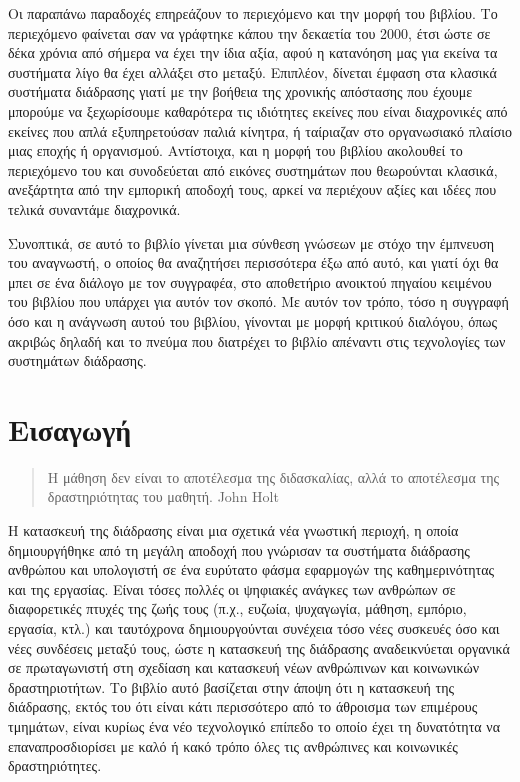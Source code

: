 \documentclass[
]{article}
\begin{document}
Οι παραπάνω παραδοχές επηρεάζουν το περιεχόμενο και την μορφή του
βιβλίου. Το περιεχόμενο φαίνεται σαν να γράφτηκε κάπου την δεκαετία του
2000, έτσι ώστε σε δέκα χρόνια από σήμερα να έχει την ίδια αξία, αφού η
κατανόηση μας για εκείνα τα συστήματα λίγο θα έχει αλλάξει στο μεταξύ.
Επιπλέον, δίνεται έμφαση στα κλασικά συστήματα διάδρασης γιατί με την
βοήθεια της χρονικής απόστασης που έχουμε μπορούμε να ξεχωρίσουμε
καθαρότερα τις ιδιότητες εκείνες που είναι διαχρονικές από εκείνες που
απλά εξυπηρετούσαν παλιά κίνητρα, ή ταίριαζαν στο οργανωσιακό πλαίσιο
μιας εποχής ή οργανισμού. Αντίστοιχα, και η μορφή του βιβλίου ακολουθεί
το περιεχόμενο του και συνοδεύεται από εικόνες συστημάτων που θεωρούνται
κλασικά, ανεξάρτητα από την εμπορική αποδοχή τους, αρκεί να περιέχουν
αξίες και ιδέες που τελικά συναντάμε διαχρονικά.

Συνοπτικά, σε αυτό το βιβλίο γίνεται μια σύνθεση γνώσεων με στόχο την
έμπνευση του αναγνωστή, ο οποίος θα αναζητήσει περισσότερα έξω από αυτό,
και γιατί όχι θα μπει σε ένα διάλογο με τον συγγραφέα, στο αποθετήριο
ανοικτού πηγαίου κειμένου του βιβλίου που υπάρχει για αυτόν τον σκοπό.
Με αυτόν τον τρόπο, τόσο η συγγραφή όσο και η ανάγνωση αυτού του
βιβλίου, γίνονται με μορφή κριτικού διαλόγου, όπως ακριβώς δηλαδή και το
πνεύμα που διατρέχει το βιβλίο απέναντι στις τεχνολογίες των συστημάτων
διάδρασης.

\hypertarget{ux3b5ux3b9ux3c3ux3b1ux3b3ux3c9ux3b3ux3ae}{%
\section{Εισαγωγή}\label{ux3b5ux3b9ux3c3ux3b1ux3b3ux3c9ux3b3ux3ae}}

\begin{quote}
Η μάθηση δεν είναι το αποτέλεσμα της διδασκαλίας, αλλά το αποτέλεσμα της
δραστηριότητας του μαθητή. John Holt
\end{quote}

Η κατασκευή της διάδρασης είναι μια σχετικά νέα γνωστική περιοχή, η
οποία δημιουργήθηκε από τη μεγάλη αποδοχή που γνώρισαν τα συστήματα
διάδρασης ανθρώπου και υπολογιστή σε ένα ευρύτατο φάσμα εφαρμογών της
καθημερινότητας και της εργασίας. Είναι τόσες πολλές οι ψηφιακές ανάγκες
των ανθρώπων σε διαφορετικές πτυχές της ζωής τους (π.χ., ευζωία,
ψυχαγωγία, μάθηση, εμπόριο, εργασία, κτλ.) και ταυτόχρονα δημιουργούνται
συνέχεια τόσο νέες συσκευές όσο και νέες συνδέσεις μεταξύ τους, ώστε η
κατασκευή της διάδρασης αναδεικνύεται οργανικά σε πρωταγωνιστή στη
σχεδίαση και κατασκευή νέων ανθρώπινων και κοινωνικών δραστηριοτήτων. Το
βιβλίο αυτό βασίζεται στην άποψη ότι η κατασκευή της διάδρασης, εκτός
του ότι είναι κάτι περισσότερο από το άθροισμα των επιμέρους τμημάτων,
είναι κυρίως ένα νέο τεχνολογικό επίπεδο το οποίο έχει τη δυνατότητα να
επαναπροσδιορίσει με καλό ή κακό τρόπο όλες τις ανθρώπινες και
κοινωνικές δραστηριότητες.
\end{document}
